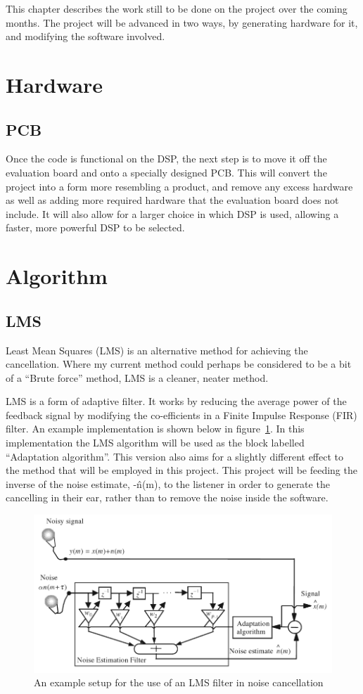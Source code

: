 This chapter describes the work still to be done on the project over the coming months.
The project will be advanced in two ways, by generating hardware for it, and modifying the software involved.

\section{Hardware}
\subsection{PCB}
Once the code is functional on the DSP, the next step is to move it off the evaluation board and onto a specially designed PCB.
This will convert the project into a form more resembling a product, and remove any excess hardware as well as adding more required hardware that the evaluation board does not include.
It will also allow for a larger choice in which DSP is used, allowing a faster, more powerful DSP to be selected.

\section{Algorithm}
\subsection{LMS}
\label{sec:LMS}
Least Mean Squares (LMS) is an alternative method for achieving the cancellation.
Where my current method could perhaps be considered to be a bit of a ``Brute force'' method, LMS is a cleaner, neater method.

LMS is a form of adaptive filter.
It works by reducing the average power of the feedback signal by modifying the co-efficients in a Finite Impulse Response (FIR) filter.
An example implementation is shown below in figure~\ref{fig:lmsfilter}.
In this implementation the LMS algorithm will be used as the block labelled ``Adaptation algorithm''.
This version also aims for a slightly different effect to the method that will be employed in this project.
This project will be feeding the inverse of the noise estimate, -\^{n}(m), to the listener in order to generate the cancelling in their ear, rather than to remove the noise inside the software.

\begin{figure}[H]
	\centering
	\includegraphics[width=\textwidth]{./img/lmsfilter.png}
	\caption{An example setup for the use of an LMS filter in noise cancellation \cite{AdvancedDSPing}}
	\label{fig:lmsfilter}
\end{figure}

